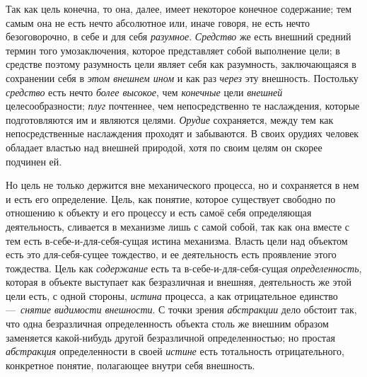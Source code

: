 \documentclass[twoside]{article}
\begin{document}
{{{{Так как цель конечна, то она, далее, имеет некоторое конечное
содержание; тем самым она не есть нечто абсолютное или, иначе говоря, не
есть нечто безоговорочно, в себе и для себя
{\em разумное}.
{\em Средство} же есть
внешний средний термин того умозаключения, которое представляет собой
выполнение цели; в средстве поэтому разумность цели являет себя как
разумность, заключающаяся в сохранении себя в
{\em этом внешнем ином}
и как раз {\em через}
эту внешность. Постольку
{\em средство} есть нечто
{\em более высокое}, чем
{\em конечные} цели
{\em внешней}
целесообразности;
{\em плуг} почтеннее, чем
непосредственно те наслаждения, которые подготовляются им и являются
целями. {\em Орудие}
сохраняется, между тем как непосредственные наслаждения
проходят и забываются. В своих орудиях человек обладает властью над внешней
природой, хотя по своим целям он скорее подчинен ей.

Но цель не только держится вне механического процесса, но и
сохраняется в нем и есть его определение. Цель, как понятие, которое
существует свободно по отношению к объекту и его процессу и есть самоё себя
определяющая деятельность, сливается в механизме лишь с самой собой, так
как она вместе с тем есть в-себе-и-для-себя-сущая истина механизма. Власть
цели над объектом есть это для-себя-сущее тождество, и ее деятельность есть
проявление этого тождества. Цель как
{\em содержание} есть та
в-себе-и-для-себя-сущая
{\em определенность},
которая в объекте выступает как безразличная и внешняя,
деятельность же этой цели есть, с одной стороны,
{\em истина} процесса, а
как отрицательное единство —~{\em снятие
видимости внешности}. С точки зрения
{\em абстракции} дело
обстоит так, что одна безразличная определенность объекта столь же внешним
образом заменяется какой-нибудь другой безразличной определенностью; но
простая {\em абстракция}
определенности в своей
{\em истине} есть
тотальность отрицательного, конкретное понятие, полагающее внутри себя
внешность.

}}}}
\end{document}
